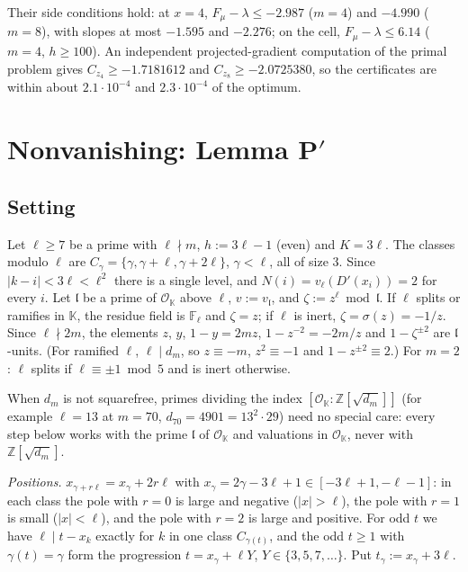 \documentclass[11pt]{amsart}
\theoremstyle{definition}
\theoremstyle{remark}
\numberwithin{equation}{section}
\newcommand{\ZZ}{\mathbb{Z}}
\newcommand{\KK}{\mathbb{K}}
\newcommand{\cO}{\mathcal{O}}
\newcommand{\fl}{\mathfrak{l}}
\begin{document}
Their side conditions hold: at $x=4$, $F_\mu-\lambda\le-2.987$ ($m=4$) and $-4.990$ ($m=8$), with slopes at most $-1.595$
and $-2.276$; on the cell, $F_\mu-\lambda\le6.14$ ($m=4$, $h\ge100$). An independent projected-gradient computation of
the primal problem gives $C_{z_4}\ge-1.7181612$ and $C_{z_8}\ge-2.0725380$, so the certificates are within about
$2.1\cdot10^{-4}$ and $2.3\cdot10^{-4}$ of the optimum.

\section{Nonvanishing: Lemma P\texorpdfstring{$'$}{'}}\label{sec:nonvan}

\subsection{Setting}
Let $\ell\ge7$ be a prime with $\ell\nmid m$, $h:=3\ell-1$ (even) and $K=3\ell$. The classes modulo $\ell$ are
$C_\gamma=\{\gamma,\gamma+\ell,\gamma+2\ell\}$, $\gamma<\ell$, all of size $3$. Since $|k-i|<3\ell<\ell^2$ there is a single
level, and $N(i)=v_\ell(D'(x_i))=2$ for every $i$. Let $\fl$ be a prime of $\cO_\KK$ above $\ell$, $v:=v_\fl$, and
$\zeta:=z^\ell\bmod\fl$. If $\ell$ splits or ramifies in $\KK$, the residue field is $\mathbb F_\ell$ and $\zeta=z$; if
$\ell$ is inert, $\zeta=\sigma(z)=-1/z$. Since $\ell\nmid2m$, the elements $z$, $y$, $1-y=2mz$, $1-z^{-2}=-2m/z$ and
$1-\zeta^{\pm2}$ are $\fl$-units. (For ramified $\ell$, $\ell\mid d_m$, so $z\equiv-m$, $z^2\equiv-1$ and
$1-z^{\pm2}\equiv2$.) For $m=2$: $\ell$ splits if $\ell\equiv\pm1\bmod5$ and is inert otherwise.

When $d_m$ is not squarefree, primes dividing the index $[\cO_\KK:\ZZ[\sqrt{d_m}]]$ (for example $\ell=13$ at $m=70$,
$d_{70}=4901=13^2\cdot29$) need no special care: every step below works with the prime $\fl$ of $\cO_\KK$ and valuations
in $\cO_\KK$, never with $\ZZ[\sqrt{d_m}]$.

\emph{Positions.} $x_{\gamma+r\ell}=x_\gamma+2r\ell$ with $x_\gamma=2\gamma-3\ell+1\in[-3\ell+1,-\ell-1]$: in each class the
pole with $r=0$ is large and negative ($|x|>\ell$), the pole with $r=1$ is small ($|x|<\ell$), and the pole with $r=2$ is
large and positive. For odd $t$ we have $\ell\mid t-x_k$ exactly for $k$ in one class $C_{\gamma(t)}$, and the odd $t\ge1$
with $\gamma(t)=\gamma$ form the progression $t=x_\gamma+\ell Y$, $Y\in\{3,5,7,\dots\}$. Put $t_\gamma:=x_\gamma+3\ell$.
\end{document}
